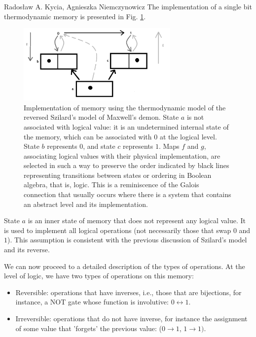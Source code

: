 \begin{artengenv2auth}{Rados\l aw A. Kycia, Agnieszka Niemczynowicz}
The implementation of a single bit thermodynamic memory is presented in Fig. \ref{Fig.BinaryCell}.
\begin{figure}[ht]
\centering
 \includegraphics[width=0.7\textwidth]{ART_Kycia_Niemczynowicz/BinaryGalois-bw.png}
 \caption{Implementation of memory using the thermodynamic model of the reversed Szilard's model of Maxwell's demon. State $a$ is not associated with logical value: it is an undetermined internal state of the memory, which can be associated with $0$ at the logical level. State $b$ represents $0$, and state $c$ represents $1$. Maps $f$ and $g$, associating logical values with their physical implementation, are selected in such a way to preserve the order indicated by black lines representing transitions between states or ordering in Boolean algebra, that is, logic. This is a reminiscence of the Galois connection \parencite{SpivakSketches, CategoryGentleIntroduction, KyciaLandauer} that usually occurs where there is a system that contains an abstract level and its implementation.}
 \label{Fig.BinaryCell}
\end{figure}

State $a$ is an inner state of memory that does not represent any logical value. It is used to implement all logical operations (not necessarily those that swap $0$ and $1$). This assumption is consistent with the previous discussion of Szilard's model and its reverse. 

We can now proceed to a detailed description of the types of operations. At the level of logic, we have two types of operations on this memory:
\begin{itemize}
 \item {Reversible: operations that have inverses, i.e., those that are bijections, for instance, a NOT gate whose function is involutive: $0  \leftrightarrow 1$.}
 \item {Irreversible: operations that do not have inverse, for instance the assignment of some value that 'forgets' the previous value: ($0 \rightarrow 1$, $1 \rightarrow 1)$.}
\end{itemize}


\end{artengenv2auth}
